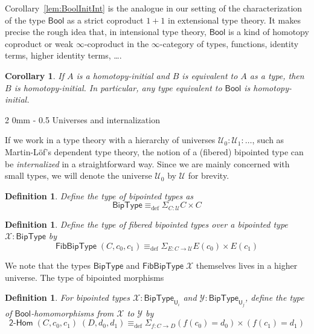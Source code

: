 \documentclass[reqno,10pt,a4paper,oneside]{amsart}
\makeatletter
\numberwithin{equation}{section}
\renewcommand{\subsection}{\@startsection
  {subsection}%
  {2}%
  {0mm}%
  {-\baselineskip}%
  {0.5\baselineskip}%
  {\normalfont\normalsize\bf}}%
\theoremstyle{mythm}
\newtheorem{corollary}[theorem]{Corollary}
\theoremstyle{mydef}
\newtheorem{definition}[theorem]{Definition}
\theoremstyle{myrmk}
\newcommand{\deq}{\equiv}
\newcommand{\defeq}{\deq_{\mathrm{def}}}
\newcommand{\U}{\mathcal{U}}
\newcommand{\sm}[1]{\Sigma_{#1}}
\newcommand{\Bool}{\mathsf{Bool}}
\newcommand{\UU}{\mathsf{U}}
\newcommand{\BoolAlg}{\mathsf{BipType}}
\newcommand{\BoolHom}{\mathsf{2}\text{-}\mathsf{Hom}}
\newcommand{\BoolFibAlg}{\mathsf{FibBipType}}
\newcommand{\X}{\mathcal{X}}
\newcommand{\Y}{\mathcal{Y}}
\makeatother
\begin{document}
Corollary~\ref{lem:BoolInitInt} is the analogue in our setting of the characterization of 
the type $\Bool$ as a strict coproduct $1+1$ in extensional type theory. It makes precise the rough idea that, 
in intensional type theory, $\Bool$ is a kind of homotopy coproduct or weak $\infty$-coproduct 
in the $\infty$-category of types, functions, identity terms, higher identity terms, \ldots.  

\begin{corollary} If $A$ is a homotopy-initial and $B$ is equivalent to $A$ as a type, then $B$ is homotopy-initial.
In particular, any type equivalent to $\Bool$ is homotopy-initial.
\end{corollary} 


\subsection{Universes and internalization}

\vspace{3cm}

If we work in a type theory with a hierarchy of universes $\U_0 : \U_1 : \ldots$, such as Martin-L{\"o}f's dependent type theory, the notion of a (fibered) bipointed type can be \emph{internalized} in a straightforward way. Since we are mainly concerned with small types, we will denote the universe $\U_0$ by $\U$ for brevity.

\begin{definition}\label{def:BoolAlg}
Define the type of \emph{bipointed types} as 
\[\BoolAlg \defeq \sm{C : \U} C \times C \]
\end{definition}

\begin{definition}\label{def:BoolFibAlg}
Define the type of \emph{fibered bipointed types} over a bipointed type $\X : \BoolAlg$ by
\[\BoolFibAlg \; (C,c_0,c_1) \defeq \sm{E : C \to \U} E(c_0) \times E(c_1) \]
\end{definition}

\noindent We note that the types $\BoolAlg$ and $\BoolFibAlg\; \X$ themselves lives in a higher universe. The type of bipointed morphisms 

\begin{definition}\label{def:BoolHom}
For bipointed types $\X : \BoolAlg_{\UU_i}$ and $\Y : \BoolAlg_{\UU_j}$, define the type of \emph{$\Bool$-homomorphisms} from $\X$ to $\Y$ by \[\BoolHom \; (C,c_0,c_1) \; (D,d_0,d_1) \defeq \sm{f:C \to D} (f(c_0) = d_0) \times (f(c_1) = d_1) \]
\end{definition}
\end{document}

